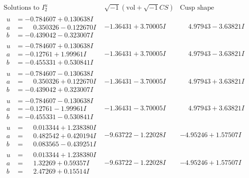 \documentclass[1p]{elsarticle_modified}
\theoremstyle{definition}
\newcommand{\I}{\sqrt{-1}}
\begin{document}
$$\begin{array}{c|c|c}  
\text{Solutions to }I^u_{2}& \I (\text{vol} + \sqrt{-1}CS) & \text{Cusp shape}\\
 \hline 
\begin{aligned}
u &= -0.784607 + 0.130638 I \\
a &= \phantom{-}0.350326 - 0.122670 I \\
b &= -0.439042 - 0.323007 I\end{aligned}
 & -1.36431 + 3.70005 I & \phantom{-}4.97943 - 3.63821 I \\ \hline\begin{aligned}
u &= -0.784607 + 0.130638 I \\
a &= -0.12761 + 1.99961 I \\
b &= -0.455331 + 0.530841 I\end{aligned}
 & -1.36431 + 3.70005 I & \phantom{-}4.97943 - 3.63821 I \\ \hline\begin{aligned}
u &= -0.784607 - 0.130638 I \\
a &= \phantom{-}0.350326 + 0.122670 I \\
b &= -0.439042 + 0.323007 I\end{aligned}
 & -1.36431 - 3.70005 I & \phantom{-}4.97943 + 3.63821 I \\ \hline\begin{aligned}
u &= -0.784607 - 0.130638 I \\
a &= -0.12761 - 1.99961 I \\
b &= -0.455331 - 0.530841 I\end{aligned}
 & -1.36431 - 3.70005 I & \phantom{-}4.97943 + 3.63821 I \\ \hline\begin{aligned}
u &= \phantom{-}0.013344 + 1.238380 I \\
a &= \phantom{-}0.482542 + 0.420194 I \\
b &= \phantom{-}0.083565 - 0.439251 I\end{aligned}
 & -9.63722 - 1.22028 I & -4.95246 + 1.57507 I \\ \hline\begin{aligned}
u &= \phantom{-}0.013344 + 1.238380 I \\
a &= \phantom{-}1.32269 + 0.59357 I \\
b &= \phantom{-}2.47269 + 0.15514 I\end{aligned}
 & -9.63722 - 1.22028 I & -4.95246 + 1.57507 I \\ \hline\begin{aligned}

\end{aligned}
\end{array}$$
\end{document}
